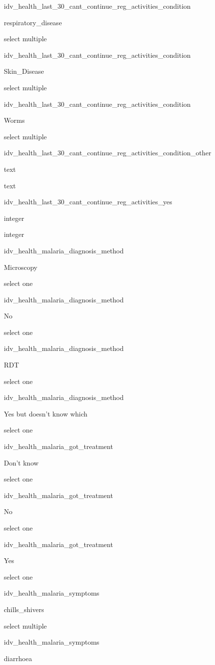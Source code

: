 \documentclass[]{article}
\begin{document}
idv\_health\_last\_30\_cant\_continue\_reg\_activities\_condition

respiratory\_disease

select multiple

idv\_health\_last\_30\_cant\_continue\_reg\_activities\_condition

Skin\_Disease

select multiple

idv\_health\_last\_30\_cant\_continue\_reg\_activities\_condition

Worms

select multiple

idv\_health\_last\_30\_cant\_continue\_reg\_activities\_condition\_other

text

text

idv\_health\_last\_30\_cant\_continue\_reg\_activities\_yes

integer

integer

idv\_health\_malaria\_diagnosis\_method

Microscopy

select one

idv\_health\_malaria\_diagnosis\_method

No

select one

idv\_health\_malaria\_diagnosis\_method

RDT

select one

idv\_health\_malaria\_diagnosis\_method

Yes but doesn't know which

select one

idv\_health\_malaria\_got\_treatment

Don't know

select one

idv\_health\_malaria\_got\_treatment

No

select one

idv\_health\_malaria\_got\_treatment

Yes

select one

idv\_health\_malaria\_symptoms

chills\_shivers

select multiple

idv\_health\_malaria\_symptoms

diarrhoea
\end{document}
